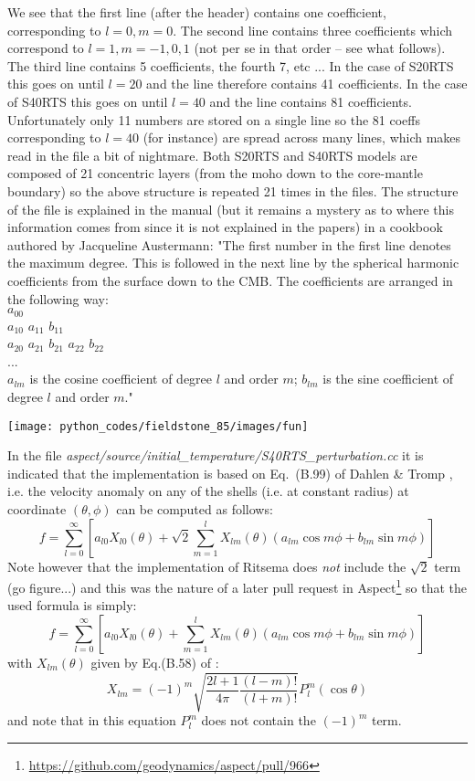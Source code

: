 We see that the first line (after the header) contains one coefficient, corresponding to ${l=0},{m=0}$. 
The second line contains three coefficients which correspond to ${l=1},{m=-1,0,1}$ (not 
per se in that order -- see what follows). The third line contains 5 
coefficients, the fourth 7, etc ... 
In the case of S20RTS this goes on until $l=20$ and the line therefore contains 41 coefficients.
In the case of S40RTS this goes on until $l=40$ and the line contains 81 coefficients.
Unfortunately only 11 numbers are stored on a single line so the 81 coeffs corresponding 
to $l=40$ (for instance)
are spread across many lines, which makes read in the file a bit of nightmare. 
Both S20RTS and S40RTS models are composed of 21 concentric layers (from the moho down 
to the core-mantle boundary) 
so the above structure is repeated 21 times in the files. 
The structure of the file is explained in the \aspect manual (but it remains a mystery 
as to where this information comes from since it is not explained in the papers) 
in a cookbook authored by Jacqueline Austermann:  
{\color{brown}
"The first number in the first line denotes the maximum degree. This is followed in
the next line by the spherical harmonic coefficients from the surface down to the
CMB. The coefficients are arranged in the following way:\\
$a_{00}$ \\
$a_{10}$ $a_{11}$ $b_{11}$ \\
$a_{20}$ $a_{21}$ $b_{21}$ $a_{22}$ $b_{22}$ \\
... \\
$a_{lm}$ is the cosine coefficient of degree $l$ and order $m$; $b_{lm}$ is
the sine coefficient of degree $l$ and order $m$."}

\begin{center}
\texttt{[image: python\_codes/fieldstone\_85/images/fun]}
\end{center}


In the file {\sl aspect/source/initial\_temperature/S40RTS\_perturbation.cc} it is 
indicated that the implementation is based on Eq.~(B.99) of Dahlen \& Tromp \cite{datr98}, 
i.e. the velocity anomaly on any of the shells 
(i.e. at constant radius) at coordinate $(\theta,\phi)$ can be computed as follows:
\[
f = \sum_{l=0}^\infty \left[a_{l0} X_{l0}(\theta) + \sqrt{2} \sum_{m=1}^l X_{lm}(\theta) 
\left(a_{lm} \cos m\phi + b_{lm} \sin m\phi \right) \right]
\]
Note however that the implementation of Ritsema does {\it not} include 
the $\sqrt{2}$ term (go figure...) and this 
was the nature of a later pull request in Aspect\footnote{\url{https://github.com/geodynamics/aspect/pull/966}} 
so that the used formula is simply:
\[
\boxed{
f = \sum_{l=0}^\infty \left[a_{l0} X_{l0}(\theta) + \sum_{m=1}^l X_{lm}(\theta) 
(a_{lm} \cos m\phi + b_{lm} \sin m\phi) \right]
}
\]
with $X_{lm}(\theta)$ given by Eq.(B.58) of  \cite{datr98}:
\[
\boxed{
X_{lm} = (-1)^m \sqrt{ \frac{2l+1}{4\pi} \frac{(l-m)!}{(l+m)!} } P_l^m(\cos\theta)
}
\]
and note that in this equation $P_l^m$ does not contain the $(-1)^m$ term.

